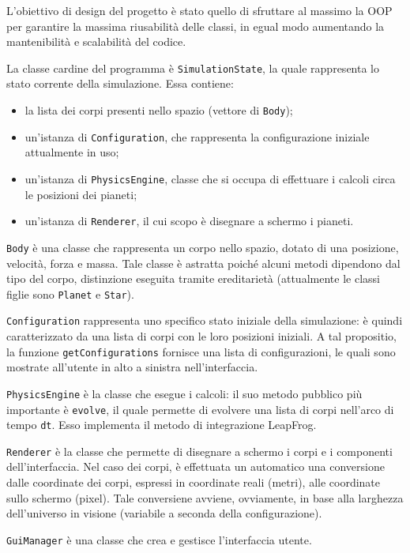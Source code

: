 \documentclass{article}
\begin{document}
L'obiettivo di design del progetto è stato quello di sfruttare al massimo la OOP per garantire la massima riusabilità delle classi, in egual modo aumentando la mantenibilità e scalabilità del codice.

La classe cardine del programma è \verb|SimulationState|, la quale rappresenta lo stato corrente della simulazione. Essa contiene:
\begin{itemize}
    \item la lista dei corpi presenti nello spazio (vettore di \verb|Body|);
    \item un'istanza di \verb|Configuration|, che rappresenta la configurazione iniziale attualmente in uso;
    \item un'istanza di \verb|PhysicsEngine|, classe che si occupa di effettuare i calcoli circa le posizioni dei pianeti;
    \item un'istanza di \verb|Renderer|, il cui scopo è disegnare a schermo i pianeti.
\end{itemize}

\verb|Body| è una classe che rappresenta un corpo nello spazio, dotato di una posizione, velocità, forza e massa. Tale classe è astratta poiché alcuni metodi dipendono dal tipo del corpo, distinzione eseguita tramite ereditarietà (attualmente le classi figlie sono \verb|Planet| e \verb|Star|).

\verb|Configuration| rappresenta uno specifico stato iniziale della simulazione: è quindi caratterizzato da una lista di corpi con le loro posizioni iniziali. A tal propositio, la funzione \verb|getConfigurations| fornisce una lista di configurazioni, le quali sono mostrate all'utente in alto a sinistra nell'interfaccia.

\verb|PhysicsEngine| è la classe che esegue i calcoli: il suo metodo pubblico più importante è \verb|evolve|, il quale permette di evolvere una lista di corpi nell'arco di tempo \verb|dt|. Esso implementa il metodo di integrazione LeapFrog.

\verb|Renderer| è la classe che permette di disegnare a schermo i corpi e i componenti dell'interfaccia. Nel caso dei corpi, è effettuata un automatico una conversione dalle coordinate dei corpi, espressi in coordinate reali (metri), alle coordinate sullo schermo (pixel). Tale conversiene avviene, ovviamente, in base alla larghezza dell'universo in visione (variabile a seconda della configurazione).

\verb|GuiManager| è una classe che crea e gestisce l'interfaccia utente.
\end{document}
